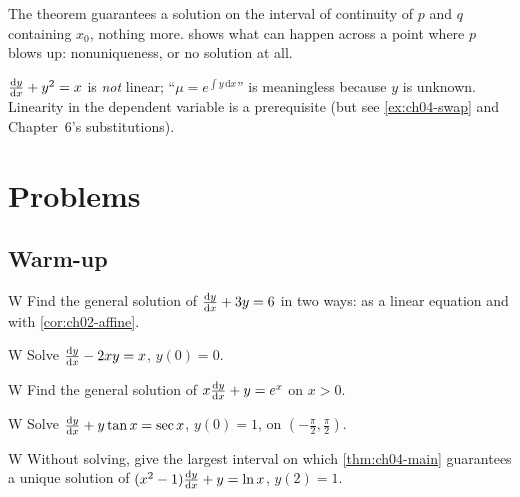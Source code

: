 \begin{pitfall}\label{pit:ch04-interval}
The theorem guarantees a solution on the interval of continuity of $p$ and $q$
containing $x_0$, nothing more.  shows what can happen
across a point where $p$ blows up: nonuniqueness, or no solution at all.
\end{pitfall}

\begin{pitfall}\label{pit:ch04-nonlinear}
$\frac{\mathrm{d}y}{\mathrm{d}x} + y^2 = x$ is \emph{not} linear; ``$\mu = e^{\int y\,\mathrm{d}x}$''
is meaningless because $y$ is unknown. Linearity in the dependent variable is a
prerequisite (but see \cref{ex:ch04-swap} and Chapter~6's substitutions).
\end{pitfall}

\section{Problems}\label{sec:ch04-problems}

\subsection*{Warm-up}

\begin{problem}{W}\label{prob:ch04-w1}
Find the general solution of $\frac{\mathrm{d}y}{\mathrm{d}x} + 3y = 6$ in two ways: as a linear
equation and with \cref{cor:ch02-affine}.
\end{problem}

\begin{problem}{W}\label{prob:ch04-w2}
Solve $\frac{\mathrm{d}y}{\mathrm{d}x} - 2xy = x$, $y(0) = 0$.
\end{problem}

\begin{problem}{W}\label{prob:ch04-w3}
Find the general solution of $x\frac{\mathrm{d}y}{\mathrm{d}x} + y = e^x$ on $x>0$.
\end{problem}

\begin{problem}{W}\label{prob:ch04-w4}
Solve $\frac{\mathrm{d}y}{\mathrm{d}x} + y\tan x = \sec x$, $y(0) = 1$, on $(-\frac\pi2,\frac\pi2)$.
\end{problem}

\begin{problem}{W}\label{prob:ch04-w5}
Without solving, give the largest interval on which \cref{thm:ch04-main}
guarantees a unique solution of $(x^2-1)\frac{\mathrm{d}y}{\mathrm{d}x} + y = \ln x$, $y(2) = 1$.
\end{problem}

